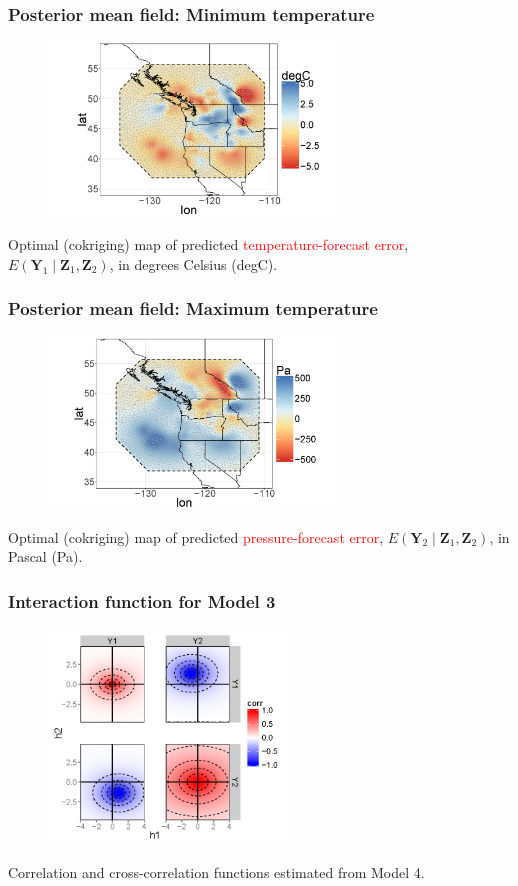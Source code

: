 \documentclass{beamer}
\newcommand{\Yvec}{\mathbf{Y}}
\newcommand{\Zvec}{\mathbf{Z}}
\newcommand{\E}{E}
\begin{document}
\begin{frame}
\frametitle{Posterior mean field: Minimum temperature}

\begin{figure}
\includegraphics[width=3in]{Fig3b1.png}
\end{figure}
\vspace{-.5cm}
Optimal (cokriging) map of predicted \textcolor{red}{temperature-forecast error}, $\E(\Yvec_1 \mid  \Zvec_1,\Zvec_2)$, in degrees Celsius (degC).
\end{frame}


\begin{frame}
\frametitle{Posterior mean field: Maximum temperature}
\begin{figure}
\includegraphics[width=3in]{Fig3b2.png}
\end{figure}
\vspace{-.5cm}
Optimal (cokriging) map of predicted \textcolor{red}{pressure-forecast error}, $\E(\Yvec_2 \mid  \Zvec_1,\Zvec_2)$, in Pascal (Pa).
\end{frame}


\begin{frame}
\frametitle{Interaction function for Model 3}
\vspace{-0.2in}
\begin{figure}
\includegraphics[width=2.5in]{Fig_cross_fns.png}
\end{figure}
\vspace{-.5cm}
\small{Correlation and cross-correlation functions estimated from Model 4.}
\end{frame}
\end{document}

